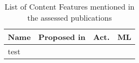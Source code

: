 \begin{table}[htbp]
    \caption{List of Content Features mentioned in the assessed publications}
    \label{tab:feat_content}
    \centering
    \begin{tabular}{m{} m{} c c}
        \toprule
        \textbf{Name} & \textbf{Proposed in} & \textbf{Act.} & \textbf{ML} \\ 
        \midrule
        test
        \bottomrule
    \end{tabular}
\end{table}